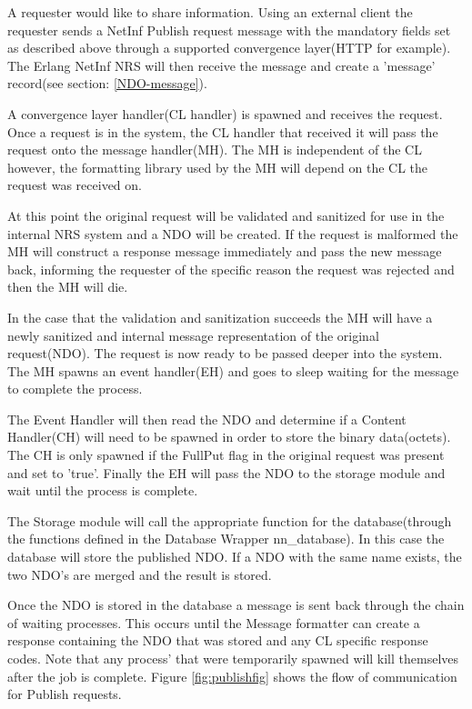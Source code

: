 A requester would like to share information. Using an external client the requester sends a NetInf Publish request message with the mandatory fields set as described above through a supported convergence layer(HTTP for example). The Erlang NetInf NRS will then receive the message and create a 'message' record(see section: \ref{NDO-message}).

A convergence layer handler(CL handler) is spawned and receives the request.
Once a request is in the system, the CL handler that received it will pass the request onto the message handler(MH). The MH is independent of the CL however, the formatting library used by the MH will depend on the CL the request was received on.

At this point the original request will be validated and sanitized for use in the internal NRS system and a NDO will be created. If the request is malformed the MH will construct a response message immediately and pass the new message back, informing the requester of the specific reason the request was rejected and then the MH will die. 

In the case that the validation and sanitization succeeds the MH will have a newly sanitized and internal message representation of the original request(NDO). The request is now ready to be passed deeper into the system. The MH spawns an event handler(EH) and goes to sleep waiting for the message to complete the process. 

The Event Handler will then read the NDO and determine if a Content Handler(CH) will need to be spawned in order to store the binary data(octets). The CH is only spawned if the FullPut flag in the original request was present and set to 'true'. Finally the EH will pass the NDO to the storage module and wait until the process is complete.

The Storage module will call the appropriate function for the database(through the functions defined in the Database Wrapper nn\_database). In this case the database will store the published NDO. If a NDO with the same name exists, the two NDO's are merged and the result is stored.

Once the NDO is stored in the database a message is sent back through the chain of waiting processes. This occurs until the Message formatter can create a response containing the NDO that was stored and any CL specific response codes. Note that any process' that were temporarily spawned will kill themselves after the job is complete. Figure \ref{fig:publishfig} shows the flow of communication for Publish requests.  


